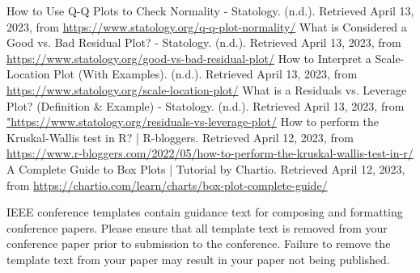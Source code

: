 \documentclass[conference]{IEEEtran}
\begin{document}
\begin{thebibliography}{00}
 How to Use Q-Q Plots to Check Normality - Statology. (n.d.). Retrieved April 13, 2023, from \url{https://www.statology.org/q-q-plot-normality/}
 What is Considered a Good vs. Bad Residual Plot? - Statology. (n.d.). Retrieved April 13, 2023, from \url{https://www.statology.org/good-vs-bad-residual-plot/}
 How to Interpret a Scale-Location Plot (With Examples). (n.d.). Retrieved April 13, 2023, from \url{https://www.statology.org/scale-location-plot/}
 What is a Residuals vs. Leverage Plot? (Definition \& Example) - Statology. (n.d.). Retrieved April 13, 2023, from \url{"https://www.statology.org/residuals-vs-leverage-plot/}
 How to perform the Kruskal-Wallis test in R? | R-bloggers. Retrieved April 12, 2023, from \url{https://www.r-bloggers.com/2022/05/how-to-perform-the-kruskal-wallis-test-in-r/}
 A Complete Guide to Box Plots | Tutorial by Chartio. Retrieved April 12, 2023, from \url{https://chartio.com/learn/charts/box-plot-complete-guide/}
\end{thebibliography}
\vspace{12pt}
\color{red}
IEEE conference templates contain guidance text for composing and formatting conference papers. Please ensure that all template text is removed from your conference paper prior to submission to the conference. Failure to remove the template text from your paper may result in your paper not being published.
\end{document}
